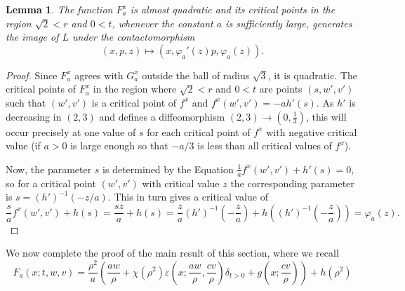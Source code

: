 \documentclass[reqno]{amsart}
\renewcommand{\epsilon}{\varepsilon}
\theoremstyle{theorem}
\newtheorem{lemma}[corollary]{Lemma}
\theoremstyle{remark}
\theoremstyle{definition}
\begin{document}
\begin{lemma}
  The function $F_a^x$ is almost quadratic and its critical points in the region $\sqrt{2} < r$ and   $0 <t $, whenever the constant $a$ is sufficiently large,  generates  the image of $L$ under the contactomorphism
  \[(x,p,z)\mapsto (x,\varphi_a'(z)p,\varphi_a(z)).\]
\end{lemma}
\begin{proof}
  Since $F_a^x$ agrees with $G_a^x$ outside the ball of radius $\sqrt 3$, it is quadratic. The critical points of $F^x_a$ in the region where $\sqrt 2<r$ and $0<t$ are points $(s,w',v')$ such that $(w',v')$ is a critical point of $f^x$ and $f^x(w',v')=-ah'(s)$.
  As $h'$ is decreasing in $(2,3)$ and defines a diffeomorphism $(2,3)\to (0,\frac{1}{3})$, this will occur precisely
  at one value of $s$ for each critical point of $f^x$ with negative critical value
  (if $a>0$ is large enough so that $-a/3$ is less than all critical values of $f^x$). %
  
  Now, the parameter $s$ is determined by the Equation $\frac{1}{a}f^x(w',v') + h'(s) = 0$, so for a critical point $(w',v')$ with critical value $z$ the corresponding parameter is $s=(h')^{-1}(-z/a)$. This in turn gives a critical value of
$$ \frac{s}{a}f^x(w',v') + h(s) = \frac{sz}{a} + h(s) = \frac{z}{a}(h')^{-1}(-\frac{z}{a} ) + h\left( (h')^{-1}(-\frac{z}{a} ) \right) = \varphi_a(z) .$$


\end{proof}




We now complete the proof of the main result of this section, where we recall
\[F_a(x;t,w,v)=\frac{\rho^2}{a}\left(\frac{aw}{\rho} + \chi(\rho^2)\epsilon\left(x;\frac{aw}{\rho},\frac{cv}{\rho}\right)\delta_{t>0}+g\left(x;\frac{cv}{\rho}\right)\right)+ h(\rho^2)\]
\end{document}
